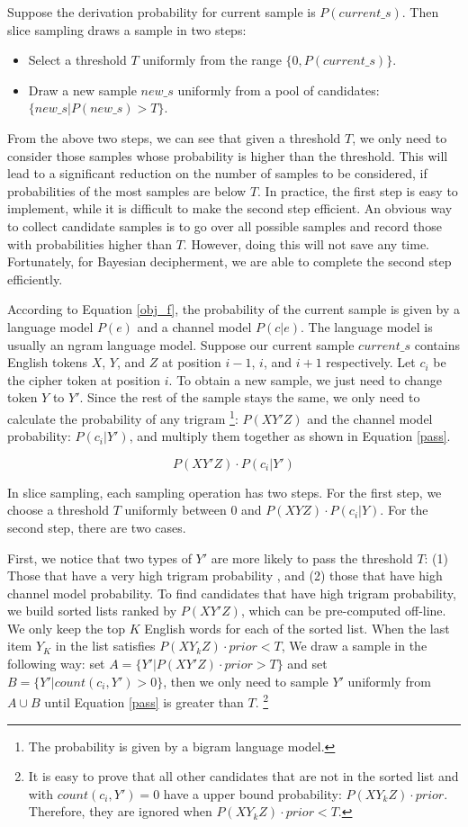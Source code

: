 Suppose the derivation probability for current sample is $ P(current\_s) $. Then slice sampling draws a sample in two steps:
\begin{itemize}
\item Select a threshold $T$ uniformly from the range $\{0,P(current\_s)\}$.
\item Draw a new sample $new\_s$ uniformly from a pool of candidates: $ \{new\_s|P(new\_s)>T\}$.
\end{itemize}
%
From the above two steps, we can see that given a threshold $T$, we only need to consider those samples whose probability is higher than the threshold. This will lead to a significant reduction on the number of samples to be considered, if probabilities of the most samples are below $T$. In practice, the first step is easy to implement, while it is difficult to make the second step efficient. An obvious way to collect candidate samples is to go over all possible samples and record those with probabilities higher than $T$. However, doing this will not save any time. Fortunately, for Bayesian decipherment, we are able to complete the second step efficiently.

According to Equation \ref{obj_f}, the probability of the current sample is given by a language model $P(e)$ and a channel model $P(c|e)$. The language model is usually an ngram language model.  Suppose our current sample $current\_s$ contains English tokens $X$, $Y$, and $Z$ at position $i-1$, $i$, and $i+1$ respectively. Let $c_{i}$ be the cipher token at position $i$. To obtain a new sample, we just need to change token $Y$ to $Y'$. Since the rest of the sample stays the same, we only need to calculate the probability of any trigram \footnote{The probability is given by a bigram language model.}: $P(XY'Z)$ and the channel model probability: $P(c_{i}|Y')$, and multiply them together as shown in Equation \ref{pass}.

 \begin{equation}
\label{pass}
P(XY'Z)\cdot P(c_{i}|Y')
\end{equation}

 In slice sampling, each sampling operation has two steps. For the first step, we choose a threshold $T$ uniformly between $0$ and $P(XYZ)\cdot P(c_{i}|Y)$. For the second step, there are two cases.

 First, we notice that two types of $Y'$ are more likely to pass the threshold $T$: (1) Those that have a very high trigram probability , and (2) those that have high channel model probability. To find candidates that have high trigram probability, we build sorted lists ranked by $P(XY'Z)$, which can be pre-computed off-line. We only keep the top $K$ English words for each of the sorted list. When the last item $Y_{K}$ in the list satisfies $P(XY_{k}Z)\cdot prior < T$, We draw a sample in the following way: set $A = \{Y'|P(XY'Z)\cdot prior>T\}$ and set $B=\{Y'|count(c_{i},Y')>0\}$, then we only need to sample $Y'$ uniformly from $A \cup B$ until Equation \ref{pass} is greater than $T$. \footnote{It is easy to prove that all other candidates that are not in the sorted list and with $count(c_{i},Y')=0$ have a upper bound probability: $P(XY_{k}Z)\cdot prior$. Therefore, they are ignored when $P(XY_{k}Z)\cdot prior < T$.}

